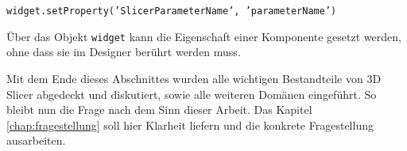 \begin{center}
	\texttt{widget.setProperty('SlicerParameterName', 'parameterName')}
\end{center}

Über das Objekt \texttt{widget} kann die Eigenschaft einer Komponente gesetzt
werden, ohne dass sie im Designer berührt werden muss.

Mit dem Ende dieses Abschnittes wurden alle wichtigen Bestandteile von 3D Slicer
abgedeckt und diskutiert, sowie alle weiteren Domänen eingeführt. So bleibt nun die
Frage nach dem Sinn dieser Arbeit. Das Kapitel \ref{chap:fragestellung} soll
hier Klarheit liefern und die konkrete Fragestellung ausarbeiten.
